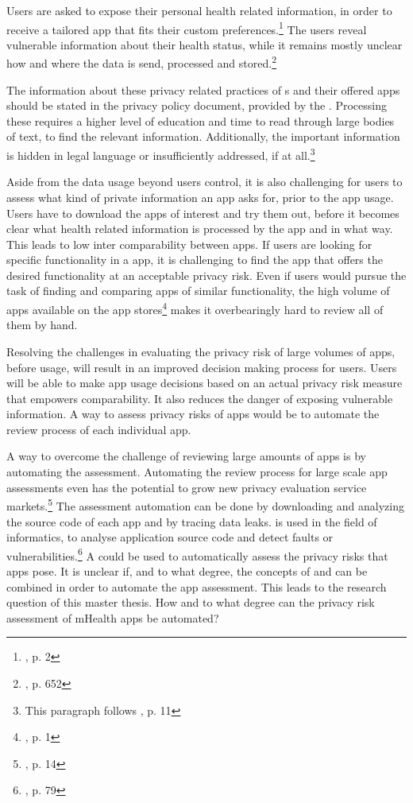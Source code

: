 \documentclass[
	a4paper,
	oneside,
	12pt,
	liststotocnumbered
]{article}
\let\cite\textcite
\begin{document}
Users are asked to expose their personal health related information, in order to receive a tailored app that fits their custom preferences.\footnote{\cite{Chen2012}, p. 2}
The users reveal vulnerable information about their health status, while it remains mostly unclear how and where the data is send, processed and stored.\footnote{\cite{He2014}, p. 652}

The information about these privacy related practices of \ap s and their offered apps should be stated in the privacy policy document, provided by the \ap.
Processing these \pps requires a higher level of education and time to read through large bodies of text, to find the relevant information. 
Additionally, the important information is hidden in legal language or insufficiently addressed, if at all.\footnote{This paragraph follows \cite{Dehling2014}, p. 11}

Aside from the data usage beyond users control, it is also challenging for users to assess what kind of private information an app asks for, prior to the app usage. 
Users have to download the apps of interest and try them out, before it becomes clear what health related information is processed by the app and in what way. 
This leads to low inter comparability between apps. 
If users are looking for specific functionality in a \mH app, it is challenging to find the app that offers the desired functionality at an acceptable privacy risk. 
Even if users would pursue the task of finding and comparing \mH apps of similar functionality, the high volume of apps available on the app stores\footnote{\cite{Enck2011}, p. 1} makes it overbearingly hard to review all of them by hand.

Resolving the challenges in evaluating the privacy risk of large volumes of \mH apps, before usage, will result in an improved decision making process for users. 
Users will be able to make app usage decisions based on an actual privacy risk measure that empowers comparability.
It also reduces the danger of exposing vulnerable information. 
A way to assess privacy risks of \mH apps would be to automate the review process of each individual app. 

A way to overcome the challenge of reviewing large amounts of \mH apps is by automating the assessment.
Automating the review process for large scale app assessments even has the potential to grow new privacy evaluation service markets.\footnote{\cite{Enck2011}, p. 14}
The assessment automation can be done by downloading and analyzing the source code of each app and by tracing data leaks. 
\Sca is used in the field of informatics, to analyse application source code and detect faults or vulnerabilities.\footnote{\cite{Baca2008}, p. 79} 
A \sca could be used to automatically assess the privacy risks that \mH apps pose.
It is unclear if, and to what degree, the concepts of \sca and \pra can be combined in order to automate the app assessment.
This leads to the research question of this master thesis. How and to what degree can the privacy risk assessment of mHealth apps be automated?
\end{document}
